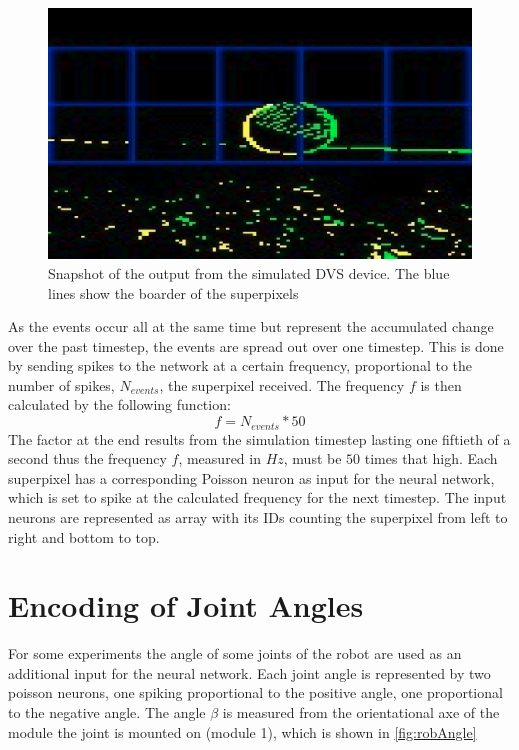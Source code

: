 \begin{figure}[htpb]
  \centering
  \includegraphics[width=\textwidth]{figures/DvsView.png}
  \caption{Snapshot of the output from the simulated DVS device. The blue lines show the boarder of the superpixels}
  \label{fig:dvsView}
\end{figure}

As the events occur all at the same time but represent the accumulated change over the past timestep, the events are spread out over one timestep. This is done by sending spikes to the network at a certain frequency, proportional to the number of spikes, $N_{events}$, the superpixel received. The frequency $f$ is then calculated by the following function:
\begin{equation}
  f = N_{events} * 50
\end{equation}
The factor at the end results from the simulation timestep lasting one fiftieth of a second thus the frequency $f$, measured in $Hz$, must be $50$ times that high.  Each superpixel has a corresponding Poisson neuron as input for the neural network, which is set to spike at the calculated frequency for the next timestep.
\newline
The input neurons are represented as array with its IDs counting the superpixel from left to right and bottom to top.

\section{Encoding of Joint Angles}\label{sec:EnOfJoint}
For some experiments the angle of some joints of the robot are used as an additional input for the neural network. Each joint angle is represented by two poisson neurons, one spiking proportional to the positive angle, one proportional to the negative angle. The angle $\beta$ is measured from the orientational axe of the module the joint is mounted on (module 1), which is shown in \autoref{fig:robAngle}

